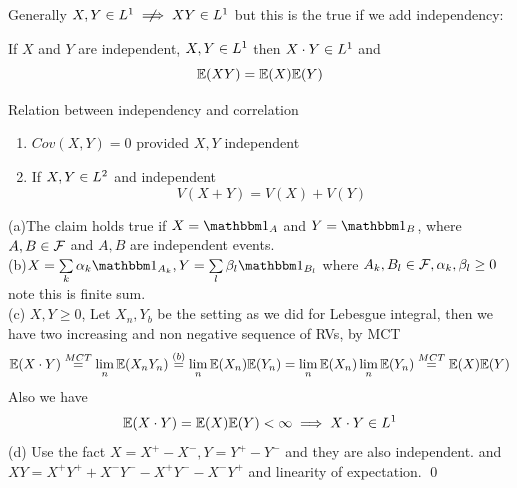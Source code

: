 Generally $X,Y\in \ls{1}\notimplies X Y\in \ls{1}$ but this is the true if we add independency:
\begin{lem}If $X$ and $Y$ are independent, $X,Y\in L^{1}$ then $X\cdot Y\in L^{1}$ and
\begin{equation*}
    \mathbb{E}(XY) = \mathbb{E}(X)\mathbb{E}(Y)
\end{equation*}
\end{lem}
\begin{cor}Relation between independency and correlation 
\begin{enumerate}
    \item $Cov(X,Y) =0$ provided $X,Y$ independent
    \item If $X,Y\in L^{2}$ and independent\begin{equation*}
        V(X+Y) = V(X) + V(Y)
    \end{equation*}
\end{enumerate}
\end{cor}
\newpage
\pf (a)The claim holds true if $X = \I_A$ and $Y = \I_B$, where $A,B\in \mathcal{F}$ and $A,B$ are independent events. \\
(b)$X = \bigs{k}\alpha_k \I_{A_k},Y = \bigs{l}\beta_l \I_{B_l}$ where $A_k, B_l\in \mathcal{F}, \alpha_k, \beta_l \geq 0$ note this is finite sum. \\
(c) $X,Y\geq 0 $, Let $X_n,Y_b$ be the setting as we did for Lebesgue integral, then we have two increasing and non negative sequence of RVs, by MCT
\begin{equation*}
    \mathbb{E}(X \cdot Y)\stackrel{MCT}{=} \lim\limits_{n}\mathbb{E}(X_n Y_n) \stackrel{(b)}{=} \lim\limits_{n} \mathbb{E}(X_n)\mathbb{E}(Y_n) = \lim\limits_{n}\mathbb{E}(X_n) \lim\limits_{n}\mathbb{E}(Y_n) \stackrel{MCT}{=} \mathbb{E}(X)\mathbb{E}(Y)
\end{equation*}Also we have
\begin{equation*}
    \mathbb{E}(X \cdot Y) = \mathbb{E}(X)\mathbb{E}(Y) < \infty \implies X \cdot Y \in L^{1}
\end{equation*}
(d) Use the fact $X = X^+ - X^-,Y = Y^+ - Y^-$ and they are also independent. and $XY = X^+Y^+ +  X^-Y^- - X^+Y^- -  X^-Y^+$ and linearity of expectation.
\qed
\newpage
